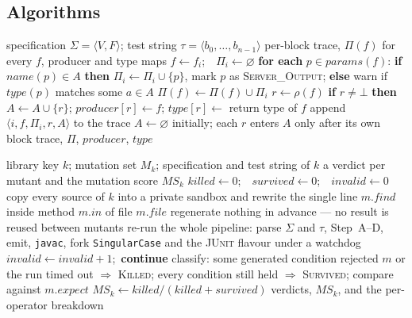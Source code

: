 \documentclass[conference]{IEEEtran}
\begin{document}
\subsection{Algorithms}

\begin{algorithm}[H]
\caption{Step A --- the propagation scan}
\begin{algorithmic}[1]
\REQUIRE specification $\Sigma=\langle V,F\rangle$; test string $\tau=\langle b_0,\dots,b_{n-1}\rangle$
\ENSURE per-block trace, $\Pi(f)$ for every $f$, producer and type maps
    \STATE $f \leftarrow f_i$;\ \ $\Pi_i \leftarrow \varnothing$
    \STATE \textbf{for each} $p \in \mathit{params}(f)$: \textbf{if} $\mathit{name}(p)\in A$ \textbf{then} $\Pi_i \leftarrow \Pi_i\cup\{p\}$, mark $p$ as \textsc{Server\_Output}; \textbf{else} warn if $\mathit{type}(p)$ matches some $a\in A$
    \STATE $\Pi(f) \leftarrow \Pi(f)\cup\Pi_i$
    \STATE $r \leftarrow \rho(f)$ 
    \STATE \textbf{if} $r \neq \bot$ \textbf{then} $A \leftarrow A\cup\{r\}$; $\mathit{producer}[r]\leftarrow f$; $\mathit{type}[r]\leftarrow$ return type of $f$
    \STATE append $\langle i,f,\Pi_i,r,A\rangle$ to the trace
\ENDFOR
\STATE $A \leftarrow \varnothing$ initially; each $r$ enters $A$ only after its own block
\RETURN trace, $\Pi$, $\mathit{producer}$, $\mathit{type}$
\end{algorithmic}
\end{algorithm}

\begin{algorithm}[H]
\caption{Mutation evaluation of a generated suite}
\begin{algorithmic}[1]
\REQUIRE library key $k$; mutation set $M_k$; specification and test string of $k$
\ENSURE a verdict per mutant and the mutation score $\mathit{MS}_k$
\STATE $\mathit{killed}\leftarrow 0$;\ \ $\mathit{survived}\leftarrow 0$;\ \ $\mathit{invalid}\leftarrow 0$
    \STATE copy every source of $k$ into a private sandbox and rewrite the single line $m.\mathit{find}$ inside method $m.\mathit{in}$ of file $m.\mathit{file}$
\ENDFOR
\STATE regenerate nothing in advance --- no result is reused between mutants
        \STATE re-run the whole pipeline: parse $\Sigma$ and $\tau$, Step~A--D, emit, \texttt{javac}, fork \texttt{SingularCase} and the \textsc{JUnit} flavour under a watchdog
    \ELSE
        \STATE $\mathit{invalid}\leftarrow \mathit{invalid}+1$;\ \textbf{continue}
    \ENDIF
    \STATE classify: some generated condition rejected $m$ or the run timed out $\Rightarrow$ \textsc{Killed}; every condition still held $\Rightarrow$ \textsc{Survived}; compare against $m.\mathit{expect}$
\ENDFOR
\STATE $\mathit{MS}_k \leftarrow \mathit{killed}/(\mathit{killed}+\mathit{survived})$ 
\RETURN verdicts, $\mathit{MS}_k$, and the per-operator breakdown
\end{algorithmic}
\end{algorithm}
\end{document}
